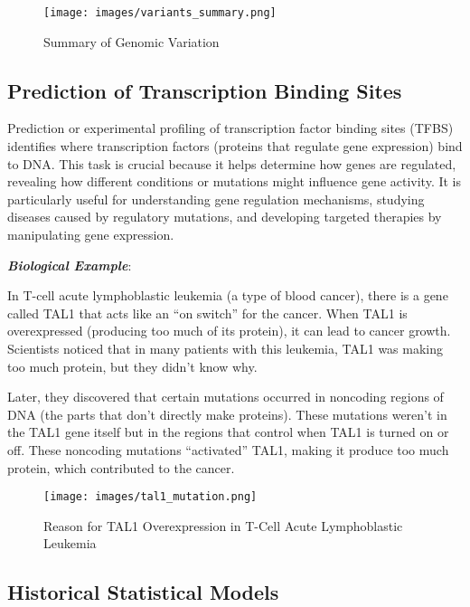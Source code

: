 \documentclass[a4paper]{article}
\begin{document}
\begin{figure}[H]
  \centering
  \texttt{[image: images/variants\_summary.png]}
  \caption{Summary of Genomic Variation}
\end{figure}

\subsection*{Prediction of Transcription Binding Sites}

Prediction or experimental profiling of transcription factor binding sites 
(TFBS) identifies where transcription factors (proteins that regulate gene 
expression) bind to DNA. This task is crucial because it helps determine how 
genes are regulated, revealing how different conditions or mutations might 
influence gene activity. It is particularly useful for understanding gene 
regulation mechanisms, studying diseases caused by regulatory mutations, and 
developing targeted therapies by manipulating gene expression.

\textit{\textbf{Biological Example}}: 

In T-cell acute lymphoblastic leukemia (a type of blood cancer), there is a 
gene called TAL1 that acts like an ``on switch'' for the cancer. 
When TAL1 is overexpressed (producing too much of its protein), 
it can lead to cancer growth. Scientists noticed that in many patients with 
this leukemia, TAL1 was making too much protein, but they didn't know why.

Later, they discovered that certain mutations occurred in noncoding 
regions of DNA (the parts that don't directly make proteins). 
These mutations weren't in the TAL1 gene itself but in the regions that control 
when TAL1 is turned on or off. These noncoding mutations ``activated'' 
TAL1, making it produce too much protein, which contributed to the cancer.


\begin{figure}[H]
  \centering
  \texttt{[image: images/tal1\_mutation.png]}
  \caption{Reason for TAL1 Overexpression in T-Cell Acute Lymphoblastic Leukemia}
\end{figure}

\subsection*{Historical Statistical Models}
\end{document}
